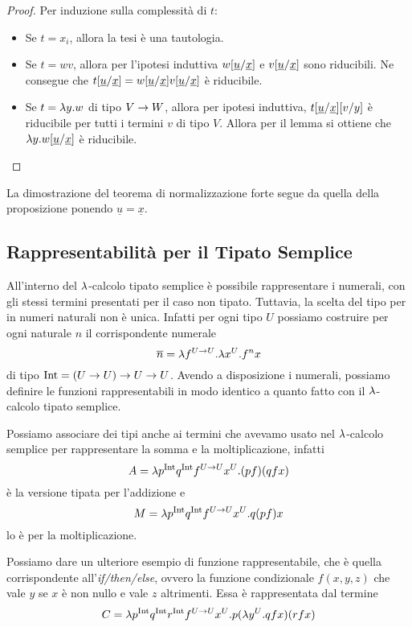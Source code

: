 \documentclass[]{marticle}
\begin{document}
\begin{proof}
    Per induzione sulla complessit\`a di $t$:
    \begin{itemize}
        \item Se $t=x_i$, allora la tesi \`e una tautologia.
        \item Se $t=wv$, allora per l'ipotesi induttiva $w[\underline{u}/\underline{x}]$ e $v[\underline{u}/\underline{x}]$ sono
            riducibili. Ne consegue che $t[\underline{u}/\underline{x}] =
            w[\underline{u}/\underline{x}] v[\underline{u}/\underline{x}]$ \`e riducibile.
        \item Se $t=\lambda y. w$ di tipo $V\rightarrow W$, allora per ipotesi induttiva,
            $t[\underline{u}/\underline{x}] [v/y]$ \`e riducibile per
            tutti i termini $v$ di tipo $V$. Allora per il lemma  si ottiene che $\lambda y. w[\underline{u}/\underline{x}]$
            \`e riducibile.
    \end{itemize}
\end{proof}

La dimostrazione del teorema di normalizzazione forte segue da quella della
proposizione ponendo $\underline{u} = \underline{x}$.


\subsection{Rappresentabilit\`a per il Tipato Semplice}
All'interno del $\lambda$-calcolo tipato semplice \`e possibile rappresentare i
numerali, con gli stessi termini presentati per il caso non tipato. Tuttavia, la
scelta del tipo per in numeri naturali non \`e unica. Infatti per ogni tipo $U$
possiamo costruire per ogni naturale $n$ il corrispondente numerale
\[
    \overline{n} = \lambda f^{U\rightarrow U} .\lambda x^U. f^n x
\]
di tipo $\text{Int} = (U\rightarrow U) \rightarrow U \rightarrow U$. Avendo a disposizione i numerali,
possiamo definire le funzioni rappresentabili in modo identico a quanto fatto
con il $\lambda$-calcolo tipato semplice.

Possiamo associare dei tipi anche ai termini che avevamo usato nel $\lambda$-calcolo
semplice per rappresentare la somma e la moltiplicazione, infatti 
\[
    A = \lambda p^{\text{Int}} q^{\text{Int}} f^{U\rightarrow U}x^U. (pf)(qfx)
\]
\`e la versione tipata per l'addizione e 
\[
    M = \lambda p^{\text{Int}} q^{\text{Int}} f^{U\rightarrow U}x^U. q (p f) x
\]
lo \`e per la moltiplicazione.

Possiamo dare un ulteriore esempio di funzione rappresentabile, che \`e quella
corrispondente all'\textit{if/then/else}, ovvero la funzione condizionale
$f(x,y,z)$ che vale $y$ se $x$ \`e non nullo e vale $z$ altrimenti. Essa \`e
rappresentata dal termine
\[
    C = \lambda p^{\text{Int}} q^{\text{Int}} r^{\text{Int}} f^{U\rightarrow U} x^U. p (\lambda y^U. qfx)(rfx)
\]
\end{document}
